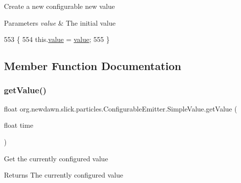 Create a new configurable new value


\begin{DoxyParams}{Parameters}
{\em value} & The initial value \\
\hline
\end{DoxyParams}

\begin{DoxyCode}
553                                          \{
554             this.\mbox{\hyperlink{classorg_1_1newdawn_1_1slick_1_1particles_1_1_configurable_emitter_1_1_simple_value_a660ac8ed4db304925cecaf64165c1f3e}{value}} = \mbox{\hyperlink{classorg_1_1newdawn_1_1slick_1_1particles_1_1_configurable_emitter_1_1_simple_value_a660ac8ed4db304925cecaf64165c1f3e}{value}};
555         \}
\end{DoxyCode}


\subsection{Member Function Documentation}
\mbox{\label{classorg_1_1newdawn_1_1slick_1_1particles_1_1_configurable_emitter_1_1_simple_value_a427ab1df90b809a575492d6e55e7357b}} 
\subsubsection{\texorpdfstring{get\+Value()}{getValue()}}
{\footnotesize\ttfamily float org.\+newdawn.\+slick.\+particles.\+Configurable\+Emitter.\+Simple\+Value.\+get\+Value (\begin{DoxyParamCaption}\item[{float}]{time }\end{DoxyParamCaption})\hspace{0.3cm}{\ttfamily [inline]}}

Get the currently configured value

\begin{DoxyReturn}{Returns}
The currently configured value 
\end{DoxyReturn}


